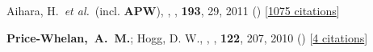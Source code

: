 \item[{\color{deemph}\scriptsize2}]Aihara, H.~\textit{et al.}~(incl. \textbf{APW}), , \apjs, \textbf{193}, 29, 2011 () [\href{http://adsabs.harvard.edu/abs/2011ApJS..193...29A}{1075 citations}]

\item[{\color{deemph}\scriptsize1}]\textbf{Price-Whelan,~A.~M.}; Hogg, D. W., , \pasp, \textbf{122}, 207, 2010 () [\href{http://adsabs.harvard.edu/abs/2010PASP..122..207P}{4 citations}]